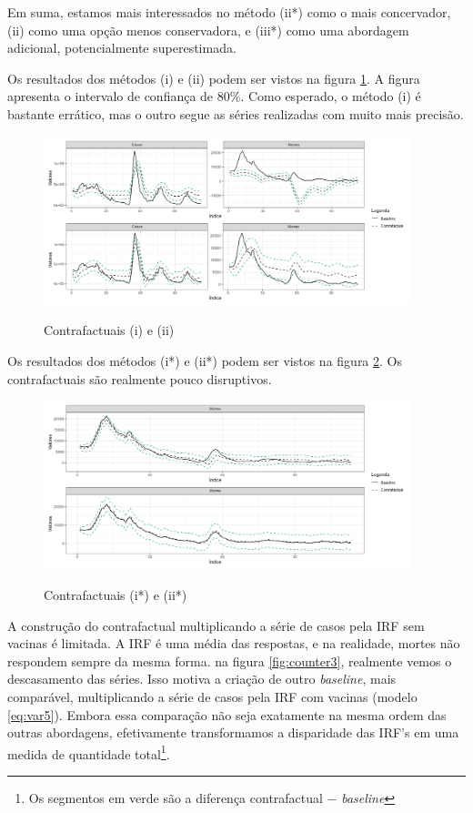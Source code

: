 \documentclass[
    article,
	12pt,				%
	oneside,			%
	a4paper,			%
	english,			%
	brazil,				%
	hyperref = {colorlinks, citecolor=c1d, linkcolor=c2d, urlcolor=c3d, colorlinks}
	]{abntex2}
\newcounter{j}
\begin{document}
Em suma, estamos mais interessados no método (ii*) como o mais concervador, (ii) como uma opção menos conservadora, e (iii*) como uma abordagem adicional, potencialmente superestimada.

Os resultados dos métodos (i) e (ii) podem ser vistos na figura \ref{fig:counter1}. A figura apresenta o intervalo de confiança de $80$\%. Como esperado, o método (i) é bastante errático, mas o outro segue as séries realizadas com muito mais precisão.

\begin{figure}[H]
    \centering
    \caption{Contrafactuais (i) e (ii)}
    \includegraphics[width = 0.95\textwidth]{Figuras/res2_cf1-2.png}
    \label{fig:counter1}
\end{figure}

Os resultados dos métodos (i*) e (ii*) podem ser vistos na figura \ref{fig:counter2}. Os contrafactuais são realmente pouco disruptivos.

\begin{figure}[H]
    \centering
    \caption{Contrafactuais (i*) e (ii*)}
    \includegraphics[width = 0.95\textwidth]{Figuras/res2_cf4-5.png}
    \label{fig:counter2}
\end{figure}

A construção do contrafactual multiplicando a série de casos pela IRF sem vacinas é limitada. A IRF é uma média das respostas, e na realidade, mortes não respondem sempre da mesma forma. na figura \ref{fig:counter3}, realmente vemos o descasamento das séries. Isso motiva a criação de outro \textit{baseline}, mais comparável, multiplicando a série de casos pela IRF com vacinas (modelo \eqref{eq:var5}). Embora essa comparação não seja exatamente na mesma ordem das outras abordagens, efetivamente transformamos a disparidade das IRF's em uma medida de quantidade total\footnote{Os segmentos em verde são a diferença contrafactual $-$ \textit{baseline}}.
\end{document}
